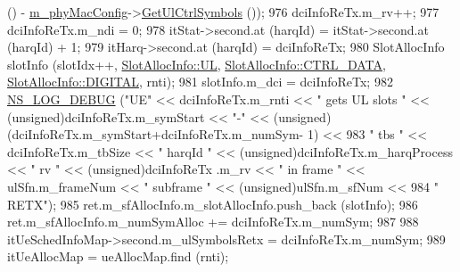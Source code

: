 \begin{DoxyCode}
       () - \hyperlink{classns3_1_1MmWaveMacScheduler_a24d7af4971d2e500fe543cefbafa2fd9}{m\_phyMacConfig}->\hyperlink{classns3_1_1MmWavePhyMacCommon_aa0bf8af14050bc5dc6513fbc86319a9b}{GetUlCtrlSymbols} ());
976                                         dciInfoReTx.m\_rv++;
977                                         dciInfoReTx.m\_ndi = 0;
978                                         itStat->second.at (harqId) = itStat->second.at (harqId) + 1;
979                                         itHarq->second.at (harqId) = dciInfoReTx;
980                                         SlotAllocInfo slotInfo (slotIdx++, 
      \hyperlink{structns3_1_1SlotAllocInfo_a6cad60db1d39034f1851e2cea625fe5da916b5be54594ead6ed677c570311cad2}{SlotAllocInfo::UL}, \hyperlink{structns3_1_1SlotAllocInfo_a3ea7cb503bfd0c9a4df55a71b81b9331a1ea636c3f068558fabacbc39934309b8}{SlotAllocInfo::CTRL\_DATA}, 
      \hyperlink{structns3_1_1SlotAllocInfo_adcbd067d82be6260b3399167d8f0b4eca47a67c342db658a08ded9ce4b49417ea}{SlotAllocInfo::DIGITAL}, rnti);
981                                         slotInfo.m\_dci = dciInfoReTx;
982                                         \hyperlink{group__logging_ga413f1886406d49f59a6a0a89b77b4d0a}{NS\_LOG\_DEBUG} (\textcolor{stringliteral}{"UE"} << dciInfoReTx.m\_rnti << \textcolor{stringliteral}{" gets UL
       slots "} << (\textcolor{keywordtype}{unsigned})dciInfoReTx.m\_symStart << \textcolor{stringliteral}{"-"} << (\textcolor{keywordtype}{unsigned})(dciInfoReTx.m\_symStart+dciInfoReTx.m\_numSym-
      1) <<
983                                                                                                 \textcolor{stringliteral}{" tbs "} << 
      dciInfoReTx.m\_tbSize << \textcolor{stringliteral}{" harqId "} << (\textcolor{keywordtype}{unsigned})dciInfoReTx.m\_harqProcess << \textcolor{stringliteral}{" rv "} << (\textcolor{keywordtype}{unsigned})dciInfoReTx
      .m\_rv << \textcolor{stringliteral}{" in frame "} << ulSfn.m\_frameNum << \textcolor{stringliteral}{" subframe "} << (\textcolor{keywordtype}{unsigned})ulSfn.m\_sfNum <<
984                                                                                                 \textcolor{stringliteral}{" RETX"});
985                                         ret.m\_sfAllocInfo.m\_slotAllocInfo.push\_back (slotInfo);
986                                         ret.m\_sfAllocInfo.m\_numSymAlloc += dciInfoReTx.m\_numSym;
987 
988                                         itUeSchedInfoMap->second.m\_ulSymbolsRetx = dciInfoReTx.m\_numSym;
989                                         itUeAllocMap = ueAllocMap.find (rnti);

\end{DoxyCode}
